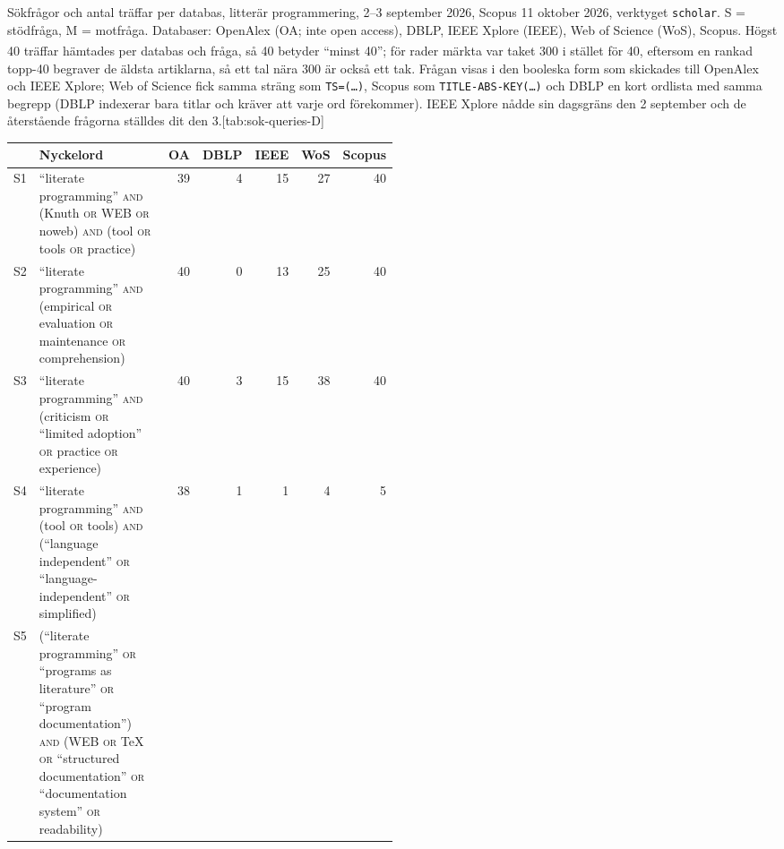\begin{table}[htbp]
  \begin{sidecaption}{Sökfrågor och antal träffar per databas, litterär programmering,
    2--3 september 2026, Scopus 11 oktober 2026, verktyget \texttt{scholar}.  S = stödfråga, M = motfråga.
    Databaser: OpenAlex (OA; inte \foreignlanguage{english}{open access}),
    DBLP, IEEE Xplore (IEEE), Web of Science (WoS), Scopus.  Högst 40
    träffar hämtades per databas och fråga, så 40 betyder \enquote{minst
    40}; för rader märkta \textsuperscript{\dag} var taket 300 i stället för 40, eftersom en rankad topp-40 begraver de äldsta artiklarna, så ett tal nära 300 är också ett tak.  Frågan visas i den booleska form som skickades till OpenAlex
    och IEEE Xplore; Web of Science fick samma sträng som
    \texttt{TS=(\dots)}, Scopus som \texttt{TITLE-ABS-KEY(\dots)} och DBLP
    en kort ordlista med samma begrepp (DBLP indexerar bara titlar och
    kräver att varje ord förekommer).  IEEE Xplore nådde sin
    dagsgräns den 2 september och de återstående frågorna ställdes dit
    den 3.}[tab:sok-queries-D]
    \centering\footnotesize
    \begin{tabular}{@{}lp{0.5\linewidth}rrrrr@{}}
      \toprule
      & Nyckelord & OA & DBLP & IEEE & WoS & Scopus \\
      \midrule
      S1 & \enquote{literate programming} \textsc{and} (Knuth \textsc{or} WEB \textsc{or} noweb) \textsc{and} (tool \textsc{or} tools \textsc{or} practice)
         & 39 & 4 & 15 & 27 & 40 \\
      S2 & \enquote{literate programming} \textsc{and} (empirical \textsc{or} evaluation \textsc{or} maintenance \textsc{or} comprehension)
         & 40 & 0 & 13 & 25 & 40 \\
      S3 & \enquote{literate programming} \textsc{and} (criticism \textsc{or} \enquote{limited adoption} \textsc{or} practice \textsc{or} experience)
         & 40 & 3 & 15 & 38 & 40 \\
      S4 & \enquote{literate programming} \textsc{and} (tool \textsc{or} tools) \textsc{and} (\enquote{language independent} \textsc{or} \enquote{language-independent} \textsc{or} simplified)
         & 38 & 1 & 1 & 4 & 5 \\
      S5 & (\enquote{literate programming} \textsc{or} \enquote{programs as literature} \textsc{or} \enquote{program documentation}) \textsc{and} (WEB \textsc{or} TeX \textsc{or} \enquote{structured documentation} \textsc{or} \enquote{documentation system} \textsc{or} readability)

\end{tabular}
\end{sidecaption}
\end{table}
